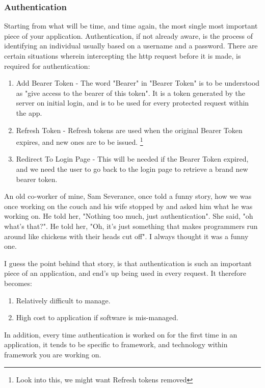 \subsubsection{ Authentication }
Starting from what will be time, and time again, the most single most important
piece of your application. Authentication, if not already aware, is the process 
of identifying an individual usually based on a username and a password. There
are certain situations wherein intercepting the http request before it is made,
is required for authentication:
\begin{enumerate}
\item Add Bearer Token - The word "Bearer" in "Bearer Token" is to be 
understood as "give access to the bearer of this token". It is a token 
generated by the server on initial login, and is to be used for every protected
request within the app. 
\item Refresh Token - Refresh tokens are used when the original Bearer Token
expires, and new ones are to be issued.
\footnote{Look into this, we might want Refresh tokens removed} 
\item Redirect To Login Page - This will be needed if the Bearer Token expired,
and we need the user to go back to the login page to retrieve a brand new 
bearer token. 
\end{enumerate}

An old co-worker of mine, Sam Severance, once told a funny story, how we was
once working on the couch and his wife stopped by and asked him what he was 
working on. He told her, "Nothing too much, just authentication". She said, "oh
what's that?". He told her, "Oh, it's just something that makes programmers run
around like chickens with their heads cut off". I always thought it was a funny
one. 

I guess the point behind that story, is that authentication is such an 
important piece of an application, and end's up being used in every request. It
therefore becomes: 
\begin{enumerate}
  \item Relatively difficult to manage.
  \item High cost to application if software is mis-managed. 
\end{enumerate}

In addition, every time authentication is worked on for the first time in an 
application, it tends to be specific to framework, and technology within 
framework you are working on. 

